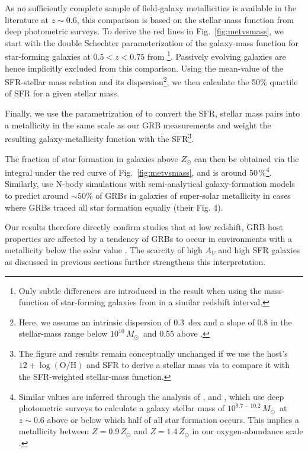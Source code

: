 \documentclass[traditabstract, longauth]{aa}
\newcommand{\oh}{12+\log(\mathrm{O/H})}
\newcommand{\Msun}{$M_\odot$}
\begin{document}
As no sufficiently complete sample of field-galaxy metallicities is available in the literature at $z\sim0.6$, this comparison is based on the stellar-mass function from deep photometric surveys. To derive the red lines in Fig.~\ref{fig:metvsmass}, we start with the double Schechter parameterization of the galaxy-mass function {for star-forming galaxies at $0.5<z<0.75$} from \citet{2014ApJ...783...85T}\footnote{{Only subtle differences are introduced in the result when using the mass-function of star-forming galaxies from \citet{2013A&A...556A..55I} in a similar redshift interval.}}. {Passively evolving galaxies are hence implicitly excluded from this comparison.} Using the mean-value of the SFR-stellar mass relation and its dispersion\footnote{{Here, we assume an intrinsic dispersion of 0.3~dex \citep{2014ApJS..214...15S} and a slope of 0.8 in the stellar-mass range below $10^{10}$\,\Msun\, \citep{2009MNRAS.394....3D, 2009A&A...504..751S, 2014MNRAS.437.3516S} and 0.55 above \citep{2012ApJ...754L..29W}.}}, we then calculate the 50\% quartile of SFR for a given stellar mass.
 
 {Finally, we use the parametrization of \citet{2010MNRAS.408.2115M} to convert the SFR, stellar mass pairs into a metallicity in the same scale as our GRB measurements and weight the resulting galaxy-metallicity function with the SFR\footnote{The figure and results remain conceptually unchanged if we use the host's $\oh$ and SFR to derive a stellar mass via \citet{2010MNRAS.408.2115M} to compare it with the SFR-weighted stellar-mass function.}.}

 {The fraction of star formation in galaxies above $Z_{\odot}$ can then be obtained via the integral under the red curve of Fig.~\ref{fig:metvsmass}, and is around 50\,\%\footnote{Similar values are inferred through the analysis of \citet{2013ApJ...778..128P}, \citet{2014A&A...565A.112H} and \citet{2014MNRAS.437.3516S}, which use deep photometric surveys \citep{2009ApJ...702.1393K, 2013A&A...556A..55I} to calculate a galaxy stellar mass of $10^{9.7-10.2}$\,\Msun\, at $z\sim0.6$ above or below which half of all star formation occurs. This implies a metallicity between $Z=0.9\,Z_{\odot}$ and $Z=1.4\,Z_{\odot}$ in our oxygen-abundance scale \citep{2010MNRAS.408.2115M}.}. Similarly, \citet{2011MNRAS.417.1013C} use N-body simulations with semi-analytical galaxy-formation models to predict around $\sim 50\%$ of GRBs in galaxies of super-solar metallicity in cases where GRBs traced all star formation equally (their Fig. 4).}

Our results therefore directly confirm studies that at low redshift, GRB host properties are affected by a tendency of GRBs {to occur in environments with a metallicity below the solar value} \citep[e.g.,][]{2006ApJ...642..636L, 2009ApJ...702..377K, 2010AJ....140.1557L, 2013ApJ...774..119G, 2013ApJ...778..128P, 2013A&A...557A..34B, 2014arXiv1409.7064V, 2015arXiv150304246S, 2015arXiv150402479P}. The scarcity of high $A_V$ and high SFR galaxies as discussed in previous sections further strengthens this interpretation.
\end{document}
